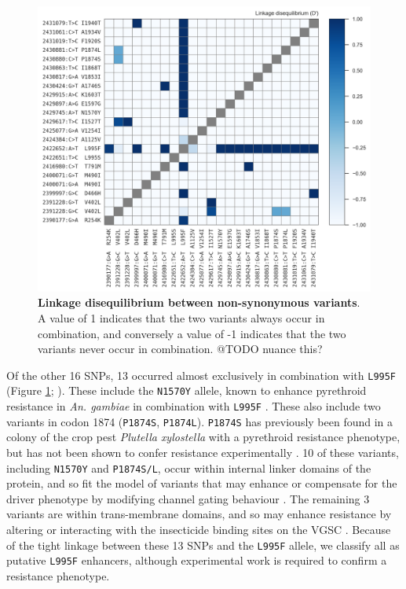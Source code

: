 \documentclass[a4paper,11pt,abstracton,hidelinks]{scrartcl}
\begin{document}
%
\begin{figure}[!t]

  \centering
  
  \includegraphics[width=\linewidth]{artwork/fig_ld.png}
  
  \caption{\textbf{Linkage disequilibrium between non-synonymous variants}. A value of 1 indicates that the two variants always occur in combination, and conversely a value of -1 indicates that the two variants never occur in combination. @TODO nuance this?}
  
  \label{fig:ld}
 
\end{figure}


%
Of the other 16 SNPs, 13 occurred almost exclusively in combination with \texttt{L995F} (Figure \ref{fig:ld}; \cite{Ag1000gConsortium2017}).
%
These include the \texttt{N1570Y} allele, known to enhance pyrethroid resistance in \textit{An. gambiae} in combination with \texttt{L995F} \cite{Jones2012}.
%
These also include two variants in codon 1874 (\texttt{P1874S}, \texttt{P1874L}). \texttt{P1874S} has previously been found in a colony of the crop pest \textit{Plutella xylostella} with a pyrethroid resistance phenotype, but has not been shown to confer resistance experimentally \cite{Sonoda2008}.
%
10 of these variants, including \texttt{N1570Y} and \texttt{P1874S/L}, occur within internal linker domains of the protein, and so fit the model of variants that may enhance or compensate for the driver phenotype by modifying channel gating behaviour \cite{Smith1997, Jones2012}.
%
The remaining 3 variants are within trans-membrane domains, and so may enhance resistance by altering or interacting with the insecticide binding sites on the VGSC \cite{Dong2014}.
%
Because of the tight linkage between these 13 SNPs and the \texttt{L995F} allele, we classify all as putative \texttt{L995F} enhancers, although experimental work is required to confirm a resistance phenotype.
\end{document}
